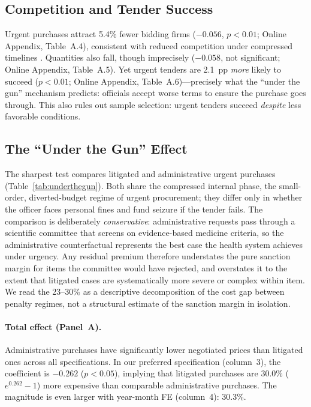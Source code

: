 \subsection{Competition and Tender Success}
\label{sec:competition}

Urgent purchases attract 5.4\% fewer bidding firms ($-0.056$, $p < 0.01$; Online Appendix, Table~A.4), consistent with reduced competition under compressed timelines \citep{bulow1996auctions}. Quantities also fall, though imprecisely ($-0.058$, not significant; Online Appendix, Table~A.5). Yet urgent tenders are 2.1~pp \emph{more} likely to succeed ($p < 0.01$; Online Appendix, Table~A.6)---precisely what the ``under the gun'' mechanism predicts: officials accept worse terms to ensure the purchase goes through. This also rules out sample selection: urgent tenders succeed \emph{despite} less favorable conditions.

\subsection{The ``Under the Gun'' Effect}
\label{sec:utg}

The sharpest test compares litigated and administrative urgent purchases (Table~\ref{tab:underthegun}). Both share the compressed internal phase, the small-order, diverted-budget regime of urgent procurement; they differ only in whether the officer faces personal fines and fund seizure if the tender fails. The comparison is deliberately \emph{conservative}: administrative requests pass through a scientific committee that screens on evidence-based medicine criteria, so the administrative counterfactual represents the best case the health system achieves under urgency. Any residual premium therefore understates the pure sanction margin for items the committee would have rejected, and overstates it to the extent that litigated cases are systematically more severe or complex within item. We read the 23--30\% as a descriptive decomposition of the cost gap between penalty regimes, not a structural estimate of the sanction margin in isolation.



\paragraph{Total effect (Panel~A).}
Administrative purchases have significantly lower negotiated prices than litigated ones across all specifications. In our preferred specification (column~3), the coefficient is $-0.262$ ($p < 0.05$), implying that litigated purchases are 30.0\% ($e^{0.262}-1$) more expensive than comparable administrative purchases. The magnitude is even larger with year-month FE (column~4): 30.3\%.

